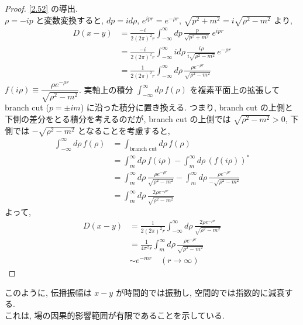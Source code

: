 \documentclass[a4paper,12pt]{article}
\begin{document}
\color{blue}
\begin{proof}
\eqref{2.52} の導出.\\
$\rho = -ip$ と変数変換すると, $dp = i d\rho$, $e^{ipr} = e^{-\rho r}$, $\sqrt{p^2 + m^2} = i\sqrt{\rho^2 - m^2}$ より,
\begin{align*}
  D(x - y) &= \frac{-i}{2(2\pi)^2 r} \int_{-\infty}^{\infty} dp\, \frac{p}{\sqrt{p^2 + m^2}}\,e^{ipr} \tag{2-4.f12}\\
  &= \frac{-i}{2(2\pi)^2 r} \int_{-\infty}^{\infty} i d\rho\, \frac{i\rho}{i\sqrt{\rho^2 - m^2}}\,e^{-\rho r} \tag{2-4.f13}\\
  &= \frac{1}{2(2\pi)^2 r} \int_{-\infty}^{\infty} d\rho\, \frac{\rho e^{-\rho r}}{\sqrt{\rho^2 - m^2}} \tag{2-4.f14}
\end{align*}
$f(i\rho) \equiv \dfrac{\rho e^{-\rho r}}{\sqrt{\rho^2 - m^2}}$. 実軸上の積分 $\displaystyle \int_{-\infty}^{\infty} d\rho\, f(\rho)$ を複素平面上の拡張して branch cut ($p = \pm im$) に沿った積分に置き換える. つまり, branch cut の上側と下側の差分をとる積分を考えるのだが, branch cut の上側では $\sqrt{\rho^2 - m^2} > 0$, 下側では $-\sqrt{\rho^2 - m^2}$ となることを考慮すると,
\begin{align*}
  \int_{-\infty}^{\infty} d\rho\, f(\rho) &= \int_{\text{branch cut}} d\rho\, f(\rho) \tag{2-4.f15}\\
  &= \int_{m}^{\infty} d\rho\, f(i\rho) - \int_{m}^{\infty} d\rho\, (f(i\rho))^{*} \tag{2-4.f16}\\
  &= \int_{m}^{\infty} d\rho\, \frac{\rho e^{-\rho r}}{\sqrt{\rho^2 - m^2}} - \int_{m}^{\infty} d\rho\, \frac{\rho e^{-\rho r}}{-\sqrt{\rho^2 - m^2}} \tag{2-4.f17}\\
  &= \int_{m}^{\infty} d\rho\, \frac{2\rho e^{-\rho r}}{\sqrt{\rho^2 - m^2}} \tag{2-4.f18}
\end{align*}
よって,
\begin{align*}
  D(x - y) &= \frac{1}{2(2\pi)^2 r} \int_{-\infty}^{\infty} d\rho\, \frac{2\rho e^{-\rho r}}{\sqrt{\rho^2 - m^2}} \tag{2-4.f18}\\
  &= \frac{1}{4\pi^2 r} \int_m^\infty d\rho \, \frac{\rho e^{-\rho r}}{\sqrt{\rho^2 - m^2}} \tag{2-4.f19}\\
  &\sim e^{-mr}\quad(r \to \infty) \tag{2-4.f20}
\end{align*}
\end{proof}

\color{black}
このように, 伝播振幅は $x - y$ が時間的では振動し, 空間的では指数的に減衰する.\\
これは, 場の因果的影響範囲が有限であることを示している.
\end{document}
